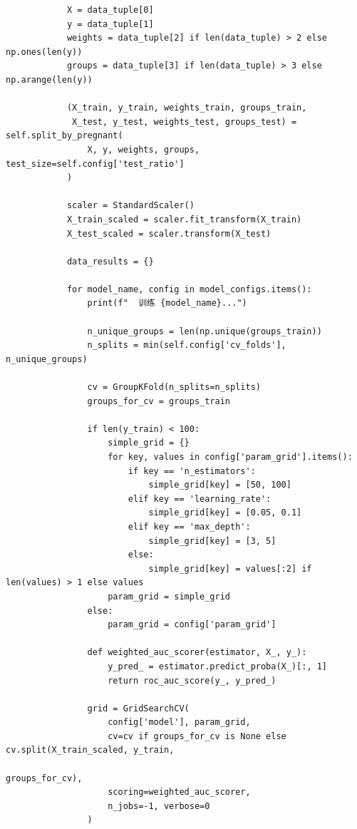 \begin{lstlisting}
            X = data_tuple[0]
            y = data_tuple[1]
            weights = data_tuple[2] if len(data_tuple) > 2 else np.ones(len(y))
            groups = data_tuple[3] if len(data_tuple) > 3 else np.arange(len(y))

            (X_train, y_train, weights_train, groups_train,
             X_test, y_test, weights_test, groups_test) = self.split_by_pregnant(
                X, y, weights, groups, test_size=self.config['test_ratio']
            )

            scaler = StandardScaler()
            X_train_scaled = scaler.fit_transform(X_train)
            X_test_scaled = scaler.transform(X_test)

            data_results = {}

            for model_name, config in model_configs.items():
                print(f"  训练 {model_name}...")

                n_unique_groups = len(np.unique(groups_train))
                n_splits = min(self.config['cv_folds'], n_unique_groups)

                cv = GroupKFold(n_splits=n_splits)
                groups_for_cv = groups_train

                if len(y_train) < 100:
                    simple_grid = {}
                    for key, values in config['param_grid'].items():
                        if key == 'n_estimators':
                            simple_grid[key] = [50, 100]
                        elif key == 'learning_rate':
                            simple_grid[key] = [0.05, 0.1]
                        elif key == 'max_depth':
                            simple_grid[key] = [3, 5]
                        else:
                            simple_grid[key] = values[:2] if len(values) > 1 else values
                    param_grid = simple_grid
                else:
                    param_grid = config['param_grid']

                def weighted_auc_scorer(estimator, X_, y_):
                    y_pred_ = estimator.predict_proba(X_)[:, 1]
                    return roc_auc_score(y_, y_pred_)

                grid = GridSearchCV(
                    config['model'], param_grid,
                    cv=cv if groups_for_cv is None else cv.split(X_train_scaled, y_train,
                                                                 groups_for_cv),
                    scoring=weighted_auc_scorer,
                    n_jobs=-1, verbose=0
                )


\end{lstlisting}
